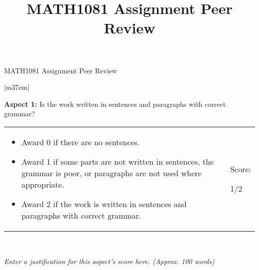 \documentclass[article,11pt]{book}
\title{MATH1081 Assignment Peer Review}
\author{}
\date{}
\begin{document}
{\huge MATH1081 Assignment Peer Review} 

\bigskip


\begin{tabular}{|m{37em}|}
    \hline
    
    \textbf{Aspect 1:} Is the work written in sentences and paragraphs with correct grammar? 
    \\ \hline
    
    \begin{tabular}{m{32em}|m{5em}}
      \begin{itemize}
          \item Award 0 if there are no sentences.
          \item Award 1 if some parts are not written in sentences, the grammar is poor, or paragraphs are not used where appropriate.
          \item Award 2 if the work is written in sentences and paragraphs with correct grammar.
      \end{itemize}  
      &  
      Score: 
      
      \medskip
      {\huge 1/2}
    \end{tabular} 
    \\ \hline
    
    \textit{Enter a justification for this aspect’s score here. (Approx. 100 words)}
    \\ \hline
\end{tabular}

\bigskip

\end{document}

